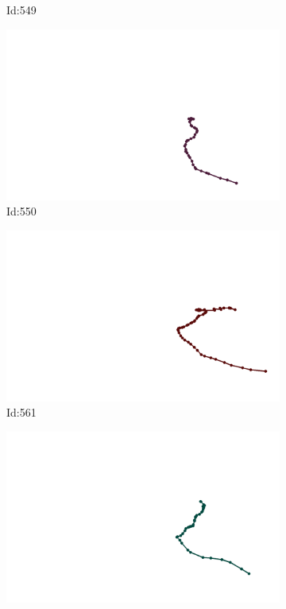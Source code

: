 \documentclass[12pt,twoside]{report}
\begin{document}
\begin{figure}
\begin{subfigure}[b]{0.20\textwidth}
\caption{Id:549}
\end{subfigure}
\begin{subfigure}[b]{0.20\textwidth}
\centering
\includegraphics[width=\textwidth]{../trajectories/550.png}
\caption{Id:550}
\end{subfigure}
\begin{subfigure}[b]{0.20\textwidth}
\centering
\includegraphics[width=\textwidth]{../trajectories/561.png}
\caption{Id:561}
\end{subfigure}
\begin{subfigure}[b]{0.20\textwidth}
\centering
\includegraphics[width=\textwidth]{../trajectories/566.png}

\end{subfigure}
\end{figure}
\end{document}
